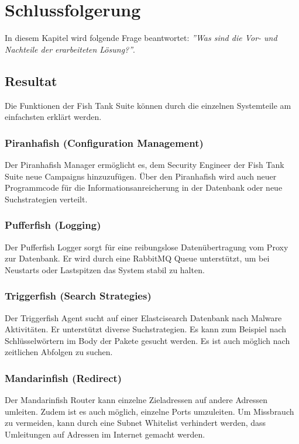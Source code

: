 \chapter{Schlussfolgerung}
\label{conc:chapter}
In diesem Kapitel wird folgende Frage beantwortet: \textit{''Was sind die Vor- und Nachteile der erarbeiteten Lösung?''}.\\

\section{Resultat}
Die Funktionen der Fish Tank Suite können durch die einzelnen Systemteile am einfachsten erklärt werden.

\subsection{Piranhafish (Configuration Management)}
Der Piranhafish Manager ermöglicht es, dem Security Engineer der Fish Tank Suite neue Campaigns hinzuzufügen. Über den Piranhafish wird auch neuer Programmcode für die Informationsanreicherung in der Datenbank oder neue Suchstrategien verteilt.

\subsection{Pufferfish (Logging)}
Der Pufferfish Logger sorgt für eine reibungslose Datenübertragung vom Proxy zur Datenbank. Er wird durch eine RabbitMQ Queue unterstützt, um bei Neustarts oder Lastspitzen das System stabil zu halten.

\subsection{Triggerfish (Search Strategies)}
Der Triggerfish Agent sucht auf einer Elastcisearch Datenbank nach Malware Aktivitäten. Er unterstützt diverse Suchstrategien. Es kann zum Beispiel nach Schlüsselwörtern im Body der Pakete gesucht werden. Es ist auch möglich nach zeitlichen Abfolgen zu suchen.

\subsection{Mandarinfish (Redirect)}
Der Mandarinfish Router kann einzelne Zieladressen auf andere Adressen umleiten. Zudem ist es auch möglich, einzelne Ports umzuleiten. Um Missbrauch zu vermeiden, kann durch eine Subnet Whitelist verhindert werden, dass Umleitungen auf Adressen im Internet gemacht werden.

